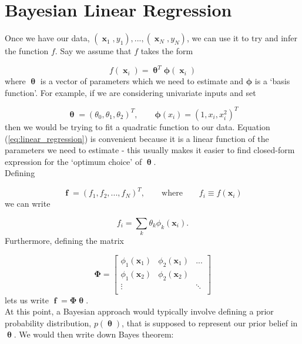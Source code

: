 \documentclass[a4paper, 11pt]{article}
\DeclareMathOperator{\f}{\boldsymbol{f}}
\DeclareMathOperator{\x}{\boldsymbol{x}}
\DeclareMathOperator{\pa}{\boldsymbol{\theta}}
\begin{document}
\section{Bayesian Linear Regression}
Once we have our data,  $(\x_1,y_1),...,(\x_N,y_N)$, we can use it to try and infer the function $f$. Say we assume that $f$ takes the form

\begin{equation}
	f(\x_i) = \pa^T \boldsymbol{\phi}(\x_i)
	\label{eq:linear_regression}
\end{equation}
where $\pa$ is a vector of parameters which we need to estimate and $\boldsymbol{\phi}$ is a `basis function'. For example, if we are considering univariate inputs and set

\begin{equation}
	\pa = (\theta_0,\theta_1,\theta_2)^T, \qquad \boldsymbol{\phi}(x_i) = (1,x_i,x_i^2)^T
\end{equation}
then we would be trying to fit a quadratic function to our data. Equation (\ref{eq:linear_regression}) is convenient because it is a linear function of the parameters we need to estimate - this usually makes it easier to find closed-form expression for the `optimum choice' of $\pa$. \\

Defining

\begin{equation}
	\f = ( f_1,f_2,...,f_N )^T,  \qquad \text{where} \qquad f_i \equiv f(\boldsymbol{x}_i) 
\end{equation}
we can write

\begin{equation}
	f_i = \sum_k \theta_k \phi_k(\boldsymbol{x}_i).
\end{equation}
Furthermore, defining the matrix

\begin{equation}
\boldsymbol{\Phi} =
\left[
  \begin{array}{ccc}
    \phi_1(\boldsymbol{x}_1) & \phi_2(\boldsymbol{x}_1) & ... \\
    \phi_1(\boldsymbol{x}_2) & \phi_2(\boldsymbol{x}_2) &  \\
    \vdots &  & \ddots \\
  \end{array}
\right]
\end{equation}
lets us write $\f=\boldsymbol{\Phi}\pa$. \\

At this point, a Bayesian approach would typically involve defining a prior probability distribution, $p(\pa)$, that is supposed to represent our prior belief in $\pa$. We would then write down Bayes theorem:
\end{document}
